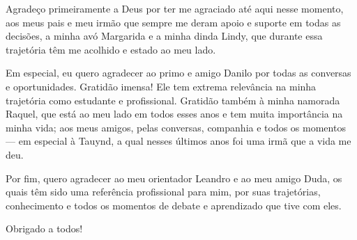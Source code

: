 Agradeço primeiramente a Deus por ter me agraciado até aqui nesse momento, aos meus pais e meu irmão que sempre me deram apoio e suporte em todas as decisões, a minha avó Margarida e a minha dinda Lindy, que durante essa trajetória têm me acolhido e estado ao meu lado.

Em especial, eu quero agradecer ao primo e amigo Danilo por todas as conversas e oportunidades. Gratidão imensa! Ele tem extrema relevância na minha trajetória como estudante e profissional. Gratidão também à minha namorada Raquel, que está ao meu lado em todos esses anos e tem muita importância na minha vida; aos meus amigos, pelas conversas, companhia e todos os momentos — em especial à Tauynd, a qual nesses últimos anos foi uma irmã que a vida me deu.

Por fim, quero agradecer ao meu orientador Leandro e ao meu amigo Duda, os quais têm sido uma referência profissional para mim, por suas trajetórias, conhecimento e todos os momentos de debate e aprendizado que tive com eles.

\begin{flushright}
Obrigado a todos!
\end{flushright}